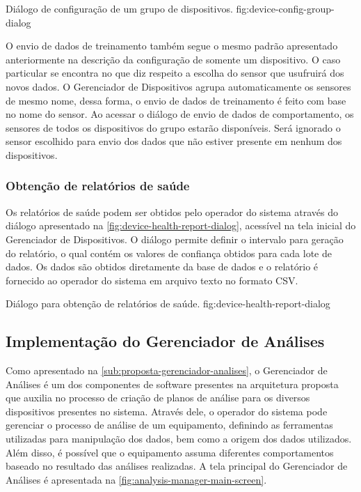   {Diálogo de configuração de um grupo de dispositivos.}
  {fig:device-config-group-dialog}

O envio de dados de treinamento também segue o mesmo padrão apresentado anteriormente na descrição
da configuração de somente um dispositivo. O caso particular se encontra no que diz respeito a
escolha do sensor que usufruirá dos novos dados. O Gerenciador de Dispositivos agrupa
automaticamente os sensores de mesmo nome, dessa forma, o envio de dados de treinamento é feito com
base no nome do sensor. Ao acessar o diálogo de envio de dados de comportamento, os sensores de
todos os dispositivos do grupo estarão disponíveis. Será ignorado o sensor escolhido para envio dos
dados que não estiver presente em nenhum dos dispositivos.


\subsubsection{Obtenção de relatórios de saúde}

Os relatórios de saúde podem ser obtidos pelo operador do sistema através do diálogo apresentado na
\cref{fig:device-health-report-dialog}, acessível na tela inicial do Gerenciador de Dispositivos. O
diálogo permite definir o intervalo para geração do relatório, o qual contém os valores de confiança
obtidos para cada lote de dados. Os dados são obtidos diretamente da base de dados e o relatório é
fornecido ao operador do sistema em arquivo texto no formato \gls{CSV}.

  {Diálogo para obtenção de relatórios de saúde.}
  {fig:device-health-report-dialog}


\subsection{Implementação do Gerenciador de Análises}

Como apresentado na \cref{sub:proposta-gerenciador-analises}, o Gerenciador de Análises é um dos
componentes de software presentes na arquitetura proposta que auxilia no processo de criação de
planos de análise para os diversos dispositivos presentes no sistema. Através dele, o operador do
sistema pode gerenciar o processo de análise de um equipamento, definindo as ferramentas utilizadas
para manipulação dos dados, bem como a origem dos dados utilizados. Além disso, é possível que o
equipamento assuma diferentes comportamentos baseado no resultado das análises realizadas. A tela
principal do Gerenciador de Análises é apresentada na \cref{fig:analysis-manager-main-screen}.

